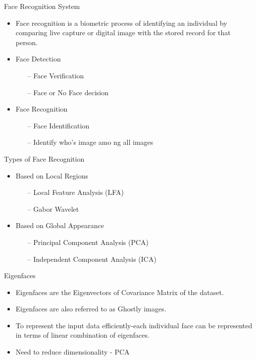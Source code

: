 \documentclass{beamer}
\begin{document}
\begin{frame}{Face Recognition System}
\begin{flushleft}
	\begin{itemize}
		\item Face recognition is a biometric process of identifying an individual by comparing live capture or digital image with the stored record for that person.
		\item Face Detection
		\begin{itemize}
			\item[--] Face Verification
			\item[--] Face or No Face decision
		\end{itemize}
		\item Face Recognition
		\begin{itemize}
			\item[--] Face Identification
			\item[--] Identify who's image amo	ng all images
		\end{itemize}
	\end{itemize}
\end{flushleft}
\end{frame}

\begin{frame}{Types of Face Recognition}
\begin{flushleft}
	\begin{itemize}
		\item Based on Local Regions
		\begin{itemize}
			\item[--] Local Feature Analysis (LFA)
			\item[--] Gabor Wavelet
		\end{itemize}
		\item Based on Global Appearance	
		\begin{itemize}
			\item[--] Principal Component Analysis (PCA) 
			\item[--] Independent Component Analysis (ICA)
		\end{itemize}
	\end{itemize}
\end{flushleft}
\end{frame}

\begin{frame}{Eigenfaces}
\begin{flushleft}
	\begin{itemize}
		\item Eigenfaces are the Eigenvectors of Covariance Matrix of the dataset.
		\item Eigenfaces are also referred to as Ghostly images.	
		\item To represent the input data efficiently-each individual face can be represented in terms of linear combination of eigenfaces.
		\item Need to reduce dimensionality - PCA
	\end{itemize}
\end{flushleft}
\end{frame}
\end{document}
